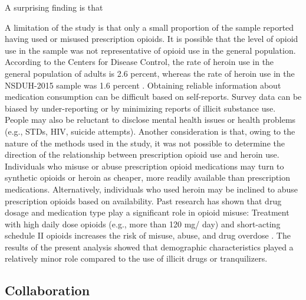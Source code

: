 \documentclass[sigconf]{acmart}
\begin{document}
A surprising finding is that 

A limitation of the study is that only a small proportion of the sample 
reported having used or misused prescription opioids. It is possible that the 
level of opioid use in the sample was not representative of opioid use in the 
general population. According to the Centers for Disease Control, the rate
of heroin use in the general population of adults is 2.6 percent, whereas
the rate of heroin use in the NSDUH-2015 sample was 1.6 percent \cite{cdc16}. 
Obtaining reliable information about medication consumption can be difficult 
based on self-reports. Survey data can be biased by under-reporting or by 
minimizing reports of illicit substance use. People may also be reluctant to 
disclose mental health issues or health problems (e.g., STDs, HIV, suicide 
attempts). Another consideration is that, owing to the nature of the methods 
used in the study, it was not possible to determine the direction of the 
relationship between prescription opioid use and heroin use. Individuals who 
misuse or abuse prescription opioid medications may turn to synthetic opioids 
or heroin as cheaper, more readily available than prescription medications. 
Alternatively, individuals who used heroin may be inclined to abuse 
prescription opioids based on availability. Past research has shown that drug 
dosage and medication type play a significant role in opioid misuse: Treatment 
with high daily dose opioids (e.g., more than 120 mg/ day) and short-acting 
schedule II opioids increases the risk of misuse, abuse, and drug overdose 
\cite{sullivan10}. The results of the present analysis showed that demographic 
characteristics played a relatively minor role compared to the use of illicit 
drugs or tranquilizers. 


\subsection{Collaboration}
\end{document}
